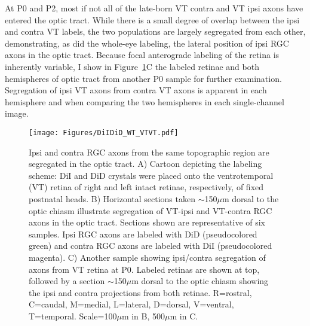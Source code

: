 At P0 and P2, most if not all of the late-born VT contra and VT ipsi axons have entered the optic tract.
While there is a small degree of overlap between the ipsi and contra VT labels, the two populations are largely segregated from each other, demonstrating, as did the whole-eye labeling, the lateral position of ipsi RGC axons in the optic tract.
Because focal anterograde labeling of the retina is inherently variable, I show in Figure~\ref{Figures/DiIDiDWTVTVT}C the labeled retinae and both hemispheres of optic tract from another P0 sample for further examination.
Segregation of ipsi VT axons from contra VT axons is apparent in each hemisphere and when comparing the two hemispheres in each single-channel image.
\begin{figure}[hbtp]
    \begin{center}
        \texttt{[image: Figures/DiIDiD\_WT\_VTVT.pdf]}
        \caption[Ipsi and contra RGC axons from the same topographic region are segregated in the optic tract.]
        {Ipsi and contra RGC axons from the same topographic region are segregated in the optic tract.
        A) Cartoon depicting the labeling scheme: DiI and DiD crystals were placed onto the ventrotemporal (VT) retina of right and left intact retinae, respectively, of fixed postnatal heads.
        B) Horizontal sections taken $\sim$150$\mu$m dorsal to the optic chiasm illustrate segregation of VT-ipsi and VT-contra RGC axons in the optic tract.
        Sections shown are representative of six samples. %
		Ipsi RGC axons are labeled with DiD (pseudocolored green) and contra RGC axons are labeled with DiI (pseudocolored magenta).
        C) Another sample showing ipsi/contra segregation of axons from VT retina at P0.
        Labeled retinas are shown at top, followed by a section $\sim$150$\mu$m dorsal to the optic chiasm showing the ipsi and contra projections from both retinae.
        R=rostral, C=caudal, M=medial, L=lateral, D=dorsal, V=ventral, T=temporal.
        Scale=100$\mu$m in B, 500$\mu$m in C.}
        \label{Figures/DiIDiDWTVTVT}
    \end{center}
\end{figure}